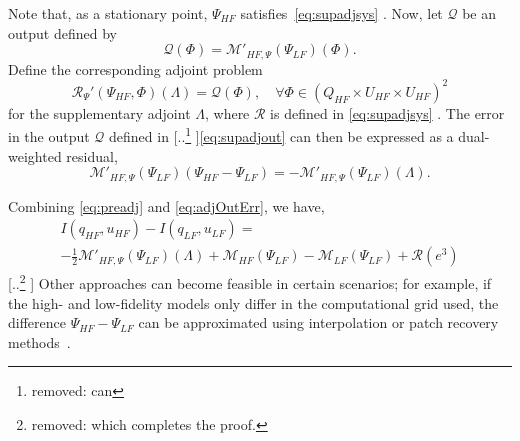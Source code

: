 \documentclass[review]{siamart0516}
\providecommand{\DIFaddtex}[1]{{\protect\color{blue} \sf #1}} %
\providecommand{\DIFdeltex}[1]{{\protect\color{red} [..\footnote{removed: #1} ]}} %
\providecommand{\DIFaddbegin}{} %
\providecommand{\DIFaddend}{} %
\providecommand{\DIFdelbegin}{} %
\providecommand{\DIFdelend}{} %
\providecommand{\DIFadd}[1]{\texorpdfstring{\DIFaddtex{#1}}{#1}} %
\providecommand{\DIFdel}[1]{\texorpdfstring{\DIFdeltex{#1}}{}} %
\newcommand{\DIFscaledelfig}{0.5}
\newlength{\DIFdelgraphicswidth} %
\newlength{\DIFdelgraphicsheight} %
\newcommand{\DIFaddincludegraphics}[2][]{{\color{blue}\fbox{\DIFOincludegraphics[#1]{#2}}}} %
\newcommand{\DIFdelincludegraphics}[2][]{%
\sbox{\DIFdelgraphicsbox}{\DIFOincludegraphics[#1]{#2}}%
\settoboxwidth{\DIFdelgraphicswidth}{\DIFdelgraphicsbox} %
\settoboxtotalheight{\DIFdelgraphicsheight}{\DIFdelgraphicsbox} %
\scalebox{\DIFscaledelfig}{%
\parbox[b]{\DIFdelgraphicswidth}{\usebox{\DIFdelgraphicsbox}\\[-\baselineskip] \rule{\DIFdelgraphicswidth}{0em}}\llap{\resizebox{\DIFdelgraphicswidth}{\DIFdelgraphicsheight}{%
\setlength{\unitlength}{\DIFdelgraphicswidth}%
\begin{picture}(1,1)%
\thicklines\linethickness{2pt} %
{\color[rgb]{1,0,0}\put(0,0){\framebox(1,1){}}}%
{\color[rgb]{1,0,0}\put(0,0){\line( 1,1){1}}}%
{\color[rgb]{1,0,0}\put(0,1){\line(1,-1){1}}}%
\end{picture}%
}\hspace*{3pt}}} %
} %
\DeclareRobustCommand{\DIFaddbegin}{\DIFOaddbegin \let\includegraphics\DIFaddincludegraphics} %
\DeclareRobustCommand{\DIFaddend}{\DIFOaddend \let\includegraphics\DIFOincludegraphics} %
\DeclareRobustCommand{\DIFdelbegin}{\DIFOdelbegin \let\includegraphics\DIFdelincludegraphics} %
\DeclareRobustCommand{\DIFdelend}{\DIFOaddend \let\includegraphics\DIFOincludegraphics} %
\begin{document}
\DIFadd{Note that, as a stationary point, $\Psi_{HF}$ satisfies~}\cref{eq:supadjsys}\DIFadd{. Now, let $\mathcal{Q}$ be an output defined by
}\begin{equation}
\mathcal{Q}(\Phi)=\mathcal{M}'_{HF,\Psi}(\Psi_{LF})(\Phi).
\label{eq:supadjout}
\end{equation}
\DIFadd{Define the corresponding adjoint problem
}\begin{equation}
\mathscr{R}_{\Psi}'(\Psi_{HF},\Phi)(\Lambda)=\mathcal{Q}(\Phi),\quad\forall\Phi\in(Q_{HF}\times U_{HF}\times U_{HF})^2
\label{eq:superAdjEq}
\end{equation}
\DIFadd{for the supplementary adjoint $\Lambda$, where $\mathscr{R}$ is defined in }\cref{eq:supadjsys}\DIFadd{. The }\DIFaddend error in the output $\mathcal{Q}$ defined in \DIFdelbegin %
\DIFdel{can }\DIFdelend \DIFaddbegin \cref{eq:supadjout} \DIFadd{can then }\DIFaddend be expressed as a dual-weighted residual,
\begin{equation}
\label{eq:adjOutErr}
\mathcal M'_{HF,\Psi}(\Psi_{LF})(\Psi_{HF}-\Psi_{LF})=-\mathcal{M}'_{HF,\Psi}(\Psi_{LF})(\Lambda).
\end{equation}
\DIFdelbegin %

\DIFdelend %
Combining \cref{eq:preadj} and \cref{eq:adjOutErr}, we have,
\DIFdelbegin %
\DIFdelend \DIFaddbegin \begin{multline}
\label{eq:finErrExp}
I(q_{HF},u_{HF})-I(q_{LF},u_{LF})=\\-\frac{1}{2}\mathcal{M}'_{HF,\Psi}(\Psi_{LF})(\Lambda)+\mathcal M_{HF}(\Psi_{LF})-\mathcal M_{LF}(\Psi_{LF})+\mathcal{R}(e^3)
\end{multline}
\DIFaddend %
\DIFdelbegin \DIFdel{which completes the proof.
}%
\DIFdelend \DIFaddbegin \DIFadd{Other approaches can become feasible in certain scenarios; for example, if the high- and low-fidelity models only differ in the computational grid used, the difference $\Psi_{HF}-\Psi_{LF}$ can be approximated using interpolation or patch recovery methods~\cite{BecVex05}.
}\DIFaddend 
\end{document}
